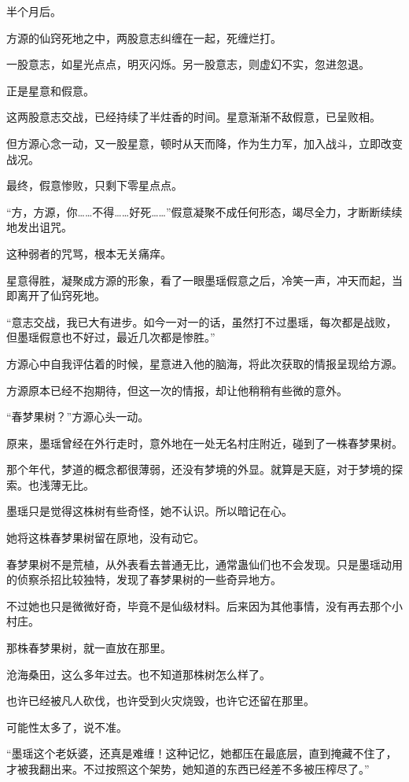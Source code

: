 
\begin{this_body}

半个月后。

方源的仙窍死地之中，两股意志纠缠在一起，死缠烂打。

一股意志，如星光点点，明灭闪烁。另一股意志，则虚幻不实，忽进忽退。

正是星意和假意。

这两股意志交战，已经持续了半炷香的时间。星意渐渐不敌假意，已呈败相。

但方源心念一动，又一股星意，顿时从天而降，作为生力军，加入战斗，立即改变战况。

最终，假意惨败，只剩下零星点点。

“方，方源，你……不得……好死……”假意凝聚不成任何形态，竭尽全力，才断断续续地发出诅咒。

这种弱者的咒骂，根本无关痛痒。

星意得胜，凝聚成方源的形象，看了一眼墨瑶假意之后，冷笑一声，冲天而起，当即离开了仙窍死地。

“意志交战，我已大有进步。如今一对一的话，虽然打不过墨瑶，每次都是战败，但墨瑶假意也不好过，最近几次都是惨胜。”

方源心中自我评估着的时候，星意进入他的脑海，将此次获取的情报呈现给方源。

方源原本已经不抱期待，但这一次的情报，却让他稍稍有些微的意外。

“春梦果树？”方源心头一动。

原来，墨瑶曾经在外行走时，意外地在一处无名村庄附近，碰到了一株春梦果树。

那个年代，梦道的概念都很薄弱，还没有梦境的外显。就算是天庭，对于梦境的探索。也浅薄无比。

墨瑶只是觉得这株树有些奇怪，她不认识。所以暗记在心。

她将这株春梦果树留在原地，没有动它。

春梦果树不是荒植，从外表看去普通无比，通常蛊仙们也不会发现。只是墨瑶动用的侦察杀招比较独特，发现了春梦果树的一些奇异地方。

不过她也只是微微好奇，毕竟不是仙级材料。后来因为其他事情，没有再去那个小村庄。

那株春梦果树，就一直放在那里。

沧海桑田，这么多年过去。也不知道那株树怎么样了。

也许已经被凡人砍伐，也许受到火灾烧毁，也许它还留在那里。

可能性太多了，说不准。

“墨瑶这个老妖婆，还真是难缠！这种记忆，她都压在最底层，直到掩藏不住了，才被我翻出来。不过按照这个架势，她知道的东西已经差不多被压榨尽了。”


\end{this_body}
